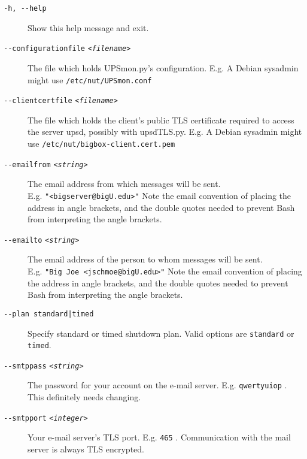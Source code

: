 \documentclass[12pt]{article}
\newcommand{\upsd}{\mbox{\textcolor{UPSDCOLOUR}{upsd}}}
\newcommand{\upsdTLS}{\mbox{\textcolor{UPSDCOLOUR}{upsdTLS.py}}}
\newcommand{\UPSmon}{\mbox{\textcolor{UPSMONCOLOUR}{UPSmon.py}}}
\newcommand{\ttit}[1]{\texttt{\textit{#1}}}
\begin{document}
\begin{description}

\item[\texttt{-h, -\/-help}] \hspace{7mm} Show this help message and exit.

\item[\texttt{-\/-configurationfile} \ttit{<filename>}] \hspace{5mm}
  The file which holds \UPSmon's configuration.  E.g. A Debian
  sysadmin might use \texttt{/etc/nut/UPSmon.conf}

\item[\texttt{-\/-clientcertfile} \ttit{<filename>}] \hspace{5mm}
  The file which holds the client's public TLS certificate required to
  access the server \upsd, possibly with \upsdTLS.  E.g. A Debian
  sysadmin might use \texttt{/etc/nut/bigbox-client.cert.pem}

\item[\texttt{-\/-emailfrom} \ttit{<string>}] \hspace{7mm} The email
  address from which messages will be sent. \\ E.g.
  \texttt{"<bigserver@bigU.edu>"} Note the email convention of placing
  the address in angle brackets, and the double quotes needed to
  prevent Bash from interpreting the angle brackets.

\item[\texttt{-\/-emailto} \ttit{<string>}] \hspace{7mm} The email
  address of the person to whom messages will be sent. \\ E.g.
  \texttt{"Big Joe <jschmoe@bigU.edu>"} Note the email convention of
  placing the address in angle brackets, and the double quotes needed
  to prevent Bash from interpreting the angle brackets.

\item[\texttt{-\/-plan standard|timed}] \hspace{5mm} Specify standard
  or timed shutdown plan. Valid options are \texttt{standard} or
  \texttt{timed}.

\item[\texttt{-\/-smtppass} \ttit{<string>}] \hspace{7mm} The password
  for your account on the e-mail server. E.g. \texttt{qwertyuiop}
  . This definitely needs changing.

\item[\texttt{-\/-smtpport} \ttit{<integer>}] \hspace{7mm} Your e-mail
  server's TLS port. E.g. \texttt{465} . Communication with the mail
  server is always TLS encrypted.


\end{description}
\end{document}
